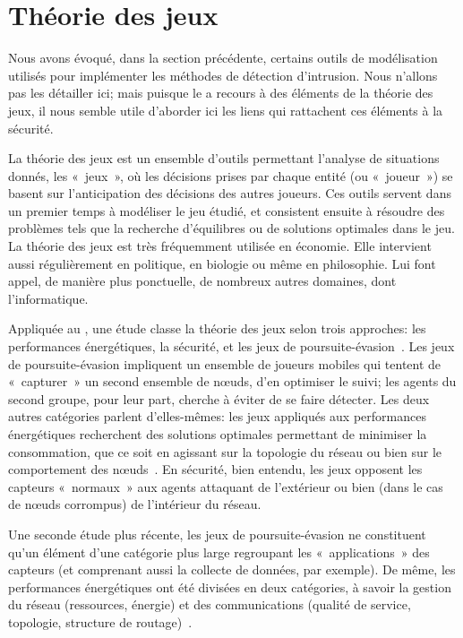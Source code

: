 \section{Théorie des jeux}

Nous avons évoqué, dans la section précédente, certains outils de modélisation utilisés pour implémenter les méthodes de détection d'intrusion.
Nous n'allons pas les détailler ici; mais puisque le  a recours à des éléments de la théorie des jeux, il nous semble utile d'aborder ici les liens qui rattachent ces éléments à la sécurité.

La théorie des jeux est un ensemble d'outils permettant l'analyse de situations donnés, les « jeux », où les décisions prises par chaque entité (ou « joueur ») se basent sur l'anticipation des décisions des autres joueurs.
Ces outils servent dans un premier temps à modéliser le jeu étudié, et consistent ensuite à résoudre des problèmes tels que la recherche d'équilibres ou de solutions optimales dans le jeu.
La théorie des jeux est très fréquemment utilisée en économie.
Elle intervient aussi régulièrement en politique, en biologie ou même en philosophie.
Lui font appel, de manière plus ponctuelle, de nombreux autres domaines, dont l'informatique.

Appliquée au \rcsfs, une étude classe la théorie des jeux selon trois approches: les performances énergétiques, la sécurité, et les jeux de poursuite-évasion~\cite{MT08}.
Les jeux de poursuite-évasion impliquent un ensemble de joueurs mobiles qui tentent de « capturer » un second ensemble de nœuds, d'en optimiser le suivi; les agents du second groupe, pour leur part, cherche à éviter de se faire détecter.
Les deux autres catégories parlent d'elles-mêmes: les jeux appliqués aux performances énergétiques recherchent des solutions optimales permettant de minimiser la consommation, que ce soit en agissant sur la topologie du réseau ou bien sur le comportement des nœuds~\cite{CPF09}.
En sécurité, bien entendu, les jeux opposent les capteurs « normaux » aux agents attaquant de l'extérieur ou bien (dans le cas de nœuds corrompus) de l'intérieur du réseau.

Une seconde étude plus récente, les jeux de poursuite-évasion ne constituent qu'un élément d'une catégorie plus large regroupant les « applications » des capteurs (et comprenant aussi la collecte de données, par exemple).
De même, les performances énergétiques ont été divisées en deux catégories, à savoir la gestion du réseau (ressources, énergie) et des communications (qualité de service, topologie, structure de routage)~\cite{SWKC12}.

